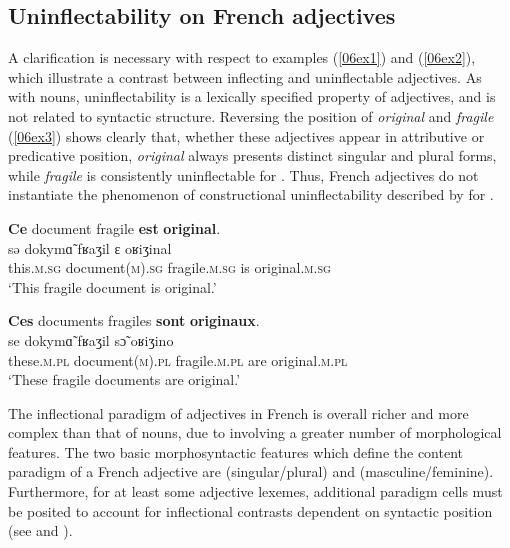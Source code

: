 \documentclass[output=paper,colorlinks,citecolor=brown]{langscibook}
\begin{document}
\subsection{Uninflectability on French adjectives}

A clarification is necessary with respect to examples (\ref{06ex1}) and (\ref{06ex2}), which illustrate a contrast between inflecting and uninflectable adjectives. As with nouns, uninflectability is a lexically specified property of adjectives, and is not related to syntactic structure. Reversing the position of \emph{original} and \emph{fragile} (\ref{06ex3}) shows clearly that, whether these adjectives appear in attributive or predicative position, \emph{original} always presents distinct singular and plural forms, while \emph{fragile} is consistently uninflectable for . Thus, French adjectives do not instantiate the phenomenon of constructional uninflectability described by \citet[148--150]{spencer2020} for .

\begin{exe}
	\ex \label{06ex3}
	\begin{xlist}
		\ex
		\glll \textbf{Ce} document fragile \textbf{est} \textbf{original}. \\
		sǝ dokymɑ̃ fʁaʒil ɛ oʁiʒinal \\
		this.\textsc{m.sg} document\textsc{(m).sg} fragile.\textsc{m.sg} is original.\textsc{m.sg} \\
		\trans ‘This fragile document is original.’
		
		\ex
		\glll \textbf{Ces} documents fragiles \textbf{sont} \textbf{originaux}. \\
		se dokymɑ̃ fʁaʒil sɔ̃ oʁiʒino \\
		these.\textsc{m.pl} document\textsc{(m).pl} fragile.\textsc{m.pl} are original.\textsc{m.pl} \\
		\trans ‘These fragile documents are original.’
	\end{xlist}
\end{exe}

The inflectional paradigm of adjectives in French is overall richer and more complex than that of nouns, due to involving a greater number of morphological features. The two basic morphosyntactic features which define the content paradigm of a French adjective are \textsc{} (singular/plural) and \textsc{} (masculine/feminine). Furthermore, for at least some adjective lexemes, additional paradigm cells must be posited to account for inflectional contrasts dependent on syntactic position (see \citealt{bonamiboye2005} and \citealt{bach-nodate-enriching}).
\end{document}

